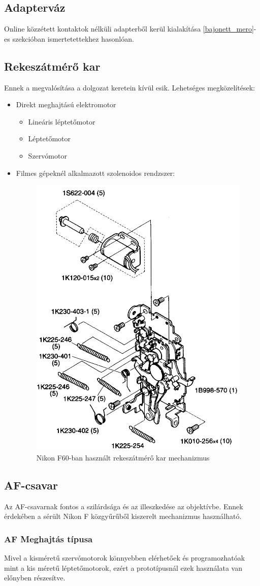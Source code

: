 \subsection{Adapterváz}
Online közzétett kontaktok nélküli adapterből kerül kialakítása \ref{bajonett_mero}-es szekcióban ismertetettekhez hasonlóan.
\subsection{Rekeszátmérő kar}
Ennek a megvalósítása a dolgozat keretein kívül esik.
Lehetséges megközelítések:
\begin{itemize}
    \item Direkt meghajtású elektromotor
    \begin{itemize}
        \item Lineáris léptetőmotor
        \item Léptetőmotor
        \item Szervómotor
    \end{itemize}
    \item Filmes gépeknél alkalmazott szolenoidos rendzszer:
    \begin{figure}[H]
        \centering
        \includegraphics[width=0.5\linewidth]{img/nikon_f60_f60d_n60_n60d_repair.png}
        \caption{Nikon F60-ban használt rekeszátmérő kar mechanizmus\cite{nikon_f60_manual}}
    \end{figure}
\end{itemize}
\subsection{AF-csavar}
Az AF-csavarnak fontos a szilárdsága és az illeszkedése az objektívbe.
Ennek érdekében a sérült Nikon F közgyűrűből kiszerelt mechanizmus használható.
\subsubsection{AF Meghajtás típusa} %
Mivel a kisméretű szervómotorok könnyebben elérhetőek és programozhatóak mint a kis méretű léptetőmotorok, ezért a prototípusnál ezek használata van előnyben részesítve.
